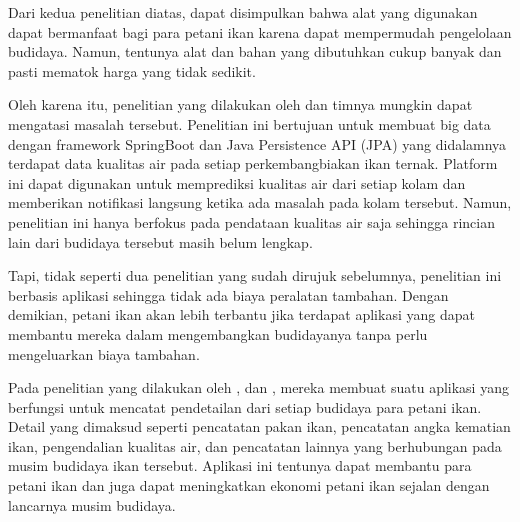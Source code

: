 Dari kedua penelitian diatas, dapat disimpulkan bahwa alat yang digunakan dapat bermanfaat bagi para petani ikan karena dapat mempermudah pengelolaan budidaya. Namun, tentunya alat dan bahan yang dibutuhkan cukup banyak dan pasti mematok harga yang tidak sedikit. 

Oleh karena itu, penelitian yang dilakukan oleh \citep{waterquality} dan timnya mungkin dapat mengatasi masalah tersebut. Penelitian ini bertujuan untuk membuat big data dengan framework SpringBoot dan Java Persistence API (JPA) yang didalamnya terdapat data kualitas air pada setiap perkembangbiakan ikan ternak. Platform ini dapat digunakan untuk memprediksi kualitas air dari setiap kolam dan memberikan notifikasi langsung ketika ada masalah pada kolam tersebut. Namun, penelitian ini hanya berfokus pada pendataan kualitas air saja sehingga rincian lain dari budidaya tersebut masih belum lengkap. \citep{waterquality} 

Tapi, tidak seperti dua penelitian yang sudah dirujuk sebelumnya, penelitian \citep{waterquality} ini berbasis aplikasi sehingga tidak ada biaya peralatan tambahan. Dengan demikian, petani ikan akan lebih terbantu jika terdapat aplikasi yang dapat membantu mereka dalam mengembangkan budidayanya tanpa perlu mengeluarkan biaya tambahan.

Pada penelitian yang dilakukan oleh \citep{fadhil2021}, \citep{gian2022} dan \citep{andri2022}, mereka membuat suatu aplikasi yang berfungsi untuk mencatat pendetailan dari setiap budidaya para petani ikan. Detail yang dimaksud seperti pencatatan pakan ikan, pencatatan angka kematian ikan, pengendalian kualitas air, dan pencatatan lainnya yang berhubungan pada musim budidaya ikan tersebut. Aplikasi ini tentunya dapat membantu para petani ikan dan juga dapat meningkatkan ekonomi petani ikan sejalan dengan lancarnya musim budidaya.

